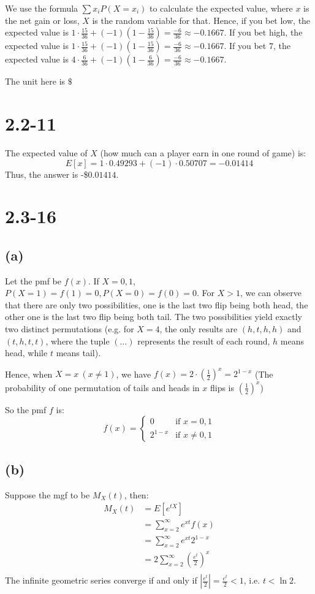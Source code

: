 \documentclass[12pt]{article}
\theoremstyle{definition}
\theoremstyle{remark}
\begin{document}
We use the formula $\sum x_i P(X=x_i)$ to calculate the expected value, where $x$ is the net gain or loss, $X$ is the random variable for that.
Hence, if you bet low, the expected value is $1\cdot \frac{15}{36}+(-1)(1-\frac{15}{36})=\frac{-6}{36}\approx -0.1667$. If you bet high, the expected value is $1\cdot \frac{15}{36}+(-1)(1-\frac{15}{36})=\frac{-6}{36}\approx -0.1667$. If you bet $7$, the expected value is $4\cdot \frac{6}{36}+(-1)(1-\frac{6}{36})=\frac{-6}{36}\approx -0.1667$.

The unit here is $\$$
\section*{2.2-11}
The expected value of $X$ (how much can a player earn in one round of game) is:
\[E[x]=1\cdot 0.49293+(-1)\cdot 0.50707=-0.01414\]
Thus, the answer is -\$$0.01414$.

\newpage
\section*{2.3-16}
\subsection*{(a)}
Let the pmf be $f(x)$. If $X=0,1$, $P(X=1)=f(1)=0, P(X=0)=f(0)=0$. For $X>1$, we can observe that there are only two possibilities, one is the last two flip being both head, the other one is the last two flip being both tail. The two possibilities yield exactly two distinct permutations (e.g. for $X=4$, the only results are $(h,t,h,h)$ and $(t,h,t,t)$, where the tuple $(\dots)$ represents the result of each round, $h$ means head, while $t$ means tail).

Hence, when $X=x\ (x\ne 1)$, we have $f(x)=2\cdot (\frac{1}{2})^x=2^{1-x}$ (The probability of one permutation of tails and heads in $x$ flips is $(\frac{1}{2})^x$)

So the pmf $f$ is:
\begin{equation}
    f(x) = \begin{cases}
        0 & \text{if }x=0,1\\
        2^{1-x} & \text{if }x\ne 0,1
    \end{cases}
\end{equation}
\subsection*{(b)}
Suppose the mgf to be $M_X(t)$, then:
\begin{align*}
    M_X(t)&=E[e^{tX}] \\
    &= \displaystyle{\sum^\infty_{x=2}e^{xt}f(x)} \\
    &= \displaystyle{\sum^\infty_{x=2}e^{xt}2^{1-x}} \\
    &= \displaystyle{2\sum^\infty_{x=2}{(\frac{e^t}{2})}^x} \\
\end{align*}
The infinite geometric series converge if and only if $|\frac{e^t}{2}|=\frac{e^t}{2}<1$, i.e. $t<\ln{2}$.
\end{document}

